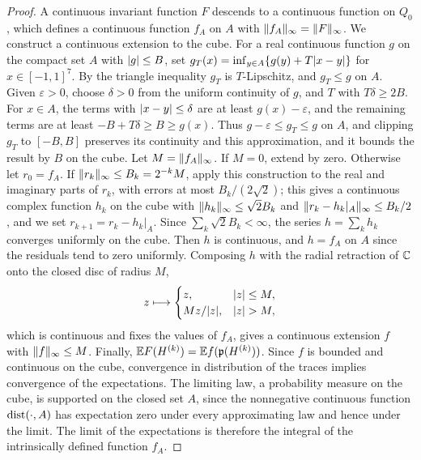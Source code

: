 \begin{proof}
A continuous invariant function $F$ descends to a continuous function on $Q_0$, which defines a continuous function $f_A$ on $A$ with $\lVert f_A\rVert_\infty=\lVert F\rVert_\infty$. We construct a continuous extension to the cube. For a real continuous function $g$ on the compact set $A$ with $\lvert g\rvert\le B$, set $g_T(x)=\inf_{y\in A}\{g(y)+T\lvert x-y\rvert\}$ for $x\in[-1,1]^7$. By the triangle inequality $g_T$ is $T$-Lipschitz, and $g_T\le g$ on $A$. Given $\varepsilon>0$, choose $\delta>0$ from the uniform continuity of $g$, and $T$ with $T\delta\ge2B$. For $x\in A$, the terms with $\lvert x-y\rvert\le\delta$ are at least $g(x)-\varepsilon$, and the remaining terms are at least $-B+T\delta\ge B\ge g(x)$. Thus $g-\varepsilon\le g_T\le g$ on $A$, and clipping $g_T$ to $[-B,B]$ preserves its continuity and this approximation, and it bounds the result by $B$ on the cube. Let $M=\lVert f_A\rVert_\infty$. If $M=0$, extend by zero. Otherwise let $r_0=f_A$. If $\lVert r_k\rVert_\infty\le B_k=2^{-k}M$, apply this construction to the real and imaginary parts of $r_k$, with errors at most $B_k/(2\sqrt2)$; this gives a continuous complex function $h_k$ on the cube with $\lVert h_k\rVert_\infty\le\sqrt2B_k$ and $\lVert r_k-h_k|_A\rVert_\infty\le B_k/2$, and we set $r_{k+1}=r_k-h_k|_A$. Since $\sum_k\sqrt2B_k<\infty$, the series $h=\sum_kh_k$ converges uniformly on the cube. Then $h$ is continuous, and $h=f_A$ on $A$ since the residuals tend to zero uniformly. Composing $h$ with the radial retraction of $\mathbb C$ onto the closed disc of radius $M$,
\[
 z\longmapsto\begin{cases}z,&\lvert z\rvert\le M,\\ Mz/\lvert z\rvert,&\lvert z\rvert>M,\end{cases}
\]
which is continuous and fixes the values of $f_A$, gives a continuous extension $f$ with $\lVert f\rVert_\infty\le M$. Finally, $\mathbb E F(H^{(k)})=\mathbb E f(\mathfrak p(H^{(k)}))$. Since $f$ is bounded and continuous on the cube, convergence in distribution of the traces implies convergence of the expectations. The limiting law, a probability measure on the cube, is supported on the closed set $A$, since the nonnegative continuous function $\operatorname{dist}(\cdot,A)$ has expectation zero under every approximating law and hence under the limit. The limit of the expectations is therefore the integral of the intrinsically defined function $f_A$.
\end{proof}
